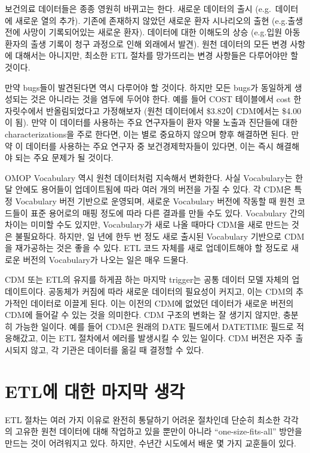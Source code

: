 \documentclass[11pt]{book}
\theoremstyle{definition}
\theoremstyle{definition}
\theoremstyle{definition}
\theoremstyle{remark}
\begin{document}
보건의료 데이터들은 종종 영원히 바뀌고는 한다. 새로운 데이터의 출시
(e.g.~데이터에 새로운 열의 추가). 기존에 존재하지 않았던 새로운 환자
시나리오의 출현 (e.g.출생 전에 사망이 기록되어있는 새로운 환자).
데이터에 대한 이해도의 상승 (e.g.입원 아동 환자의 출생 기록이 청구
과정으로 인해 외래에서 발견). 원천 데이터의 모든 변경 사항에 대해서는
아니지만, 최소한 ETL 절차를 망가뜨리는 변경 사항들은 다루어야만 할
것이다.

만약 bugs들이 발견된다면 역시 다루어야 할 것이다. 하지만 모든 bugs가
동일하게 생성되는 것은 아니라는 것을 염두에 두어야 한다. 예를 들어 COST
테이블에서 cost 한 자릿수에서 반올림되었다고 가정해보자 (원천 데이터에서
\$3.82이 CDM에서는 \$4.00이 됨). 만약 이 데이터를 사용하는 주요
연구자들이 환자 약물 노출과 진단들에 대한 characterizations을 주로
한다면, 이는 별로 중요하지 않으며 향후 해결하면 된다. 만약 이 데이터를
사용하는 주요 연구자 중 보건경제학자들이 있다면, 이는 즉시 해결해야 되는
주요 문제가 될 것이다.

OMOP Vocabulary 역시 원천 데이터처럼 지속해서 변화한다. 사실
Vocabulary는 한 달 안에도 용어들이 업데이트됨에 따라 여러 개의 버전을
가질 수 있다. 각 CDM은 특정 Vocabulary 버전 기반으로 운영되며, 새로운
Vocabulary 버전에 작동할 때 원천 코드들이 표준 용어로의 매핑 정도에 따라
다른 결과를 만들 수도 있다. Vocabulary 간의 차이는 미미할 수도 있지만,
Vocabulary가 새로 나올 때마다 CDM을 새로 만드는 것은 불필요하다. 하지만,
일 년에 한두 번 정도 새로 출시된 Vocabulary 기반으로 CDM을 재가공하는
것은 좋을 수 있다. ETL 코드 자체를 새로 업데이트해야 할 정도로 새로운
버전의 Vocabulary가 나오는 일은 매우 드물다.

CDM 또는 ETL의 유지를 하게끔 하는 마지막 trigger는 공통 데이터 모델
자체의 업데이트이다. 공동체가 커짐에 따라 새로운 데이터의 필요성이
커지고, 이는 CDM의 추가적인 데이터로 이끌게 된다. 이는 이전의 CDM에
없었던 데이터가 새로운 버전의 CDM에 들어갈 수 있는 것을 의미한다. CDM
구조의 변화는 잘 생기지 않지만, 충분히 가능한 일이다. 예를 들어 CDM은
원래의 DATE 필드에서 DATETIME 필드로 적응해갔고, 이는 ETL 절차에서
에러를 발생시킬 수 있는 일이다. CDM 버전은 자주 출시되지 않고, 각 기관은
데이터를 옮길 때 결정할 수 있다.

\section{ETL에 대한 마지막 생각}\label{etl---}

ETL 절차는 여러 가지 이유로 완전히 통달하기 어려운 절차인데 단순히
최소한 각각의 고유한 원천 데이터에 대해 작업하고 있을 뿐만이 아니라
``one-size-fits-all'' 방안을 만드는 것이 어려워지고 있다. 하지만, 수년간
시도에서 배운 몇 가지 교훈들이 있다.
\end{document}
